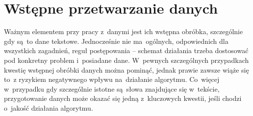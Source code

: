 \documentclass{praca1}
\begin{document}
\section{Wstępne przetwarzanie danych}

Ważnym elementem przy pracy z~danymi jest ich wstępna obróbka, szczególnie gdy są~to dane tekstowe. Jednocześnie nie ma~ogólnych, odpowiednich dla wszystkich zagadnień, reguł postępowania -- schemat działania trzeba dostosować pod konkretny problem i~posiadane dane. W~pewnych szczególnych przypadkach kwestię wstępnej obróbki danych można pominąć, jednak prawie zawsze wiąże się to~z ryzykiem negatywnego wpływu na~działanie algorytmu. Co~więcej w~przypadku gdy szczególnie istotne są~słowa znajdujące się w~tekście, przygotowanie danych może okazać się jedną z~kluczowych kwestii, jeśli chodzi o~jakość działania algorytmu.
\end{document}

